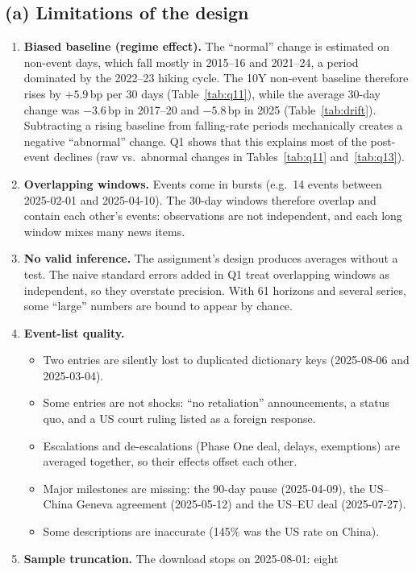 \documentclass[11pt]{article}
\begin{document}
\subsection*{(a) Limitations of the design}
\begin{enumerate}[leftmargin=1.4em,itemsep=1pt]
\item \textbf{Biased baseline (regime effect).} The ``normal'' change is
estimated on non-event days, which fall mostly in 2015--16 and 2021--24, a
period dominated by the 2022--23 hiking cycle. The 10Y non-event baseline
therefore rises by $+5.9$\,bp per 30 days (Table~\ref{tab:q11}), while the average 30-day change was
$-3.6$\,bp in 2017--20 and $-5.8$\,bp in 2025 (Table~\ref{tab:drift}).
Subtracting a rising baseline from falling-rate periods mechanically creates a
negative ``abnormal'' change. Q1 shows that this explains most of the
post-event declines (raw vs.\ abnormal changes in Tables~\ref{tab:q11}
and~\ref{tab:q13}).
\item \textbf{Overlapping windows.} Events come in bursts (e.g.\ 14 events
between 2025-02-01 and 2025-04-10). The 30-day windows therefore overlap and
contain each other's events: observations are not independent, and each long
window mixes many news items.
\item \textbf{No valid inference.} The assignment's design produces averages
without a test. The naive standard errors added in Q1 treat overlapping
windows as independent, so they overstate precision. With 61 horizons and
several series, some ``large'' numbers are bound to appear by chance.
\item \textbf{Event-list quality.}
\begin{itemize}[nosep]
\item Two entries are silently lost to duplicated dictionary keys (2025-08-06
and 2025-03-04).
\item Some entries are not shocks: ``no retaliation'' announcements, a status
quo, and a US court ruling listed as a foreign response.
\item Escalations and de-escalations (Phase One deal, delays, exemptions) are
averaged together, so their effects offset each other.
\item Major milestones are missing: the 90-day pause (2025-04-09), the
US--China Geneva agreement (2025-05-12) and the US--EU deal (2025-07-27).
\item Some descriptions are inaccurate (145\% was the US rate on China).
\end{itemize}
\item \textbf{Sample truncation.} The download stops on 2025-08-01: eight

\end{enumerate}
\end{document}
